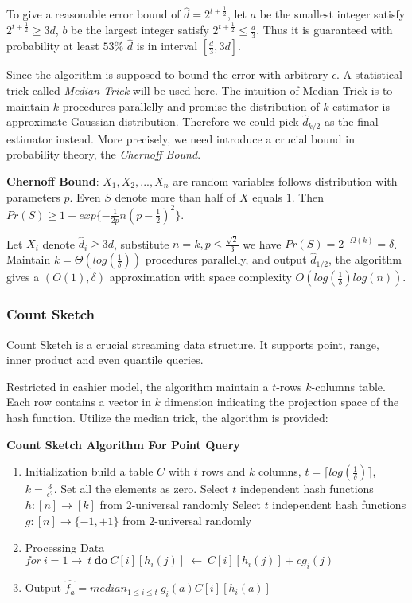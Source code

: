 \documentclass{article} %
\begin{document}
To give a reasonable error bound of $\hat{d} = 2^{t + \frac{1}{2}}$, let $a$ be the smallest integer satisfy $2^{t + \frac{1}{2}} \ge 3d$, $b$ be the largest integer satisfy $2^{t + \frac{1}{2}} \le \frac{d}{3}$. Thus it is guaranteed with probability at least $53\%$ $\hat{d}$ is in interval $[\frac{d}{3}, 3d]$.

Since the algorithm is supposed to bound the error with arbitrary $\epsilon$. A statistical trick called \emph{Median Trick} will be used here. The intuition of Median Trick is to maintain $k$ procedures parallelly and promise the distribution of $k$ estimator is approximate Gaussian distribution. Therefore we could pick $\hat{d}_{k/2}$ as the final estimator instead. More precisely, we need introduce a crucial bound in probability theory, the \emph{Chernoff Bound}.

\textbf{Chernoff Bound}: $X_1, X_2, ..., X_n$ are random variables follows distribution with parameters $p$. Even $S$ denote more than half of $X$ equals $1$. Then $Pr(S) \ge 1 - exp\{-\frac{1}{2p}n(p-\frac{1}{2})^2\}$.

Let $X_i$ denote $\hat{d}_i \ge 3d$, substitute $n = k, p \le \frac{\sqrt{2}}{3} $ we have $Pr(S) = 2^{-\Omega(k)} = \delta $. Maintain $k = \Theta(log(\frac{1}{\delta})) $ procedures parallelly, and output $\hat{d}_{1/2}$, the algorithm gives a $(O(1), \delta) $ approximation with space complexity $O(log(\frac{1}{\delta})log(n))$.

\subsubsection{Count Sketch}
Count Sketch is a crucial streaming data structure. It supports point, range, inner product and even quantile queries.

Restricted in cashier model, the algorithm maintain a $t$-rows $k$-columns table. Each row contains a vector in $k$ dimension indicating the projection space of the hash function. Utilize the median trick, the algorithm is provided:

\textbf{Count Sketch Algorithm For Point Query}
\begin{enumerate}
\item Initialization
\subitem build a table $C$ with $t$ rows and $k$ columns, $t = \lceil log(\frac{1}{\delta}) \rceil$, $k = \frac{3}{\epsilon^2} $. Set all the elements as zero.
\subitem Select $t$ independent hash functions $h : [n] \rightarrow [k]$ from $2$-universal randomly
\subitem Select $t$ independent hash functions $g : [n] \rightarrow \{-1, +1\}$ from $2$-universal randomly
\item Processing Data
\subitem $for \ i = 1 \rightarrow \ t \ \mathbf{do} \ C[i][h_i(j)] \ \leftarrow \ C[i][h_i(j)] + cg_i(j) $
\item Output
\subitem $\hat{f_a} = median_{1 \le i \le t} \ g_i(a)C[i][h_i(a)] $
\end{enumerate}
\end{document}
